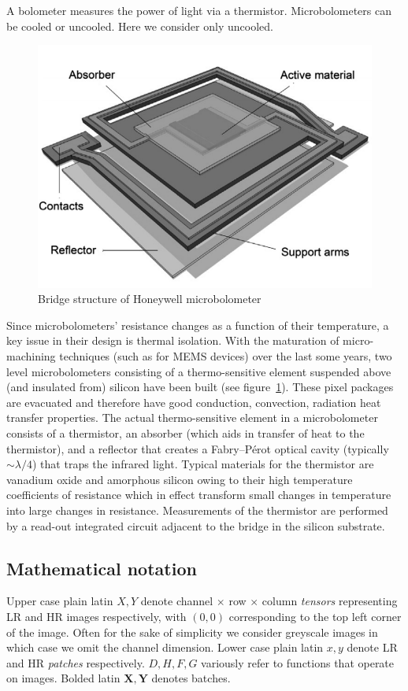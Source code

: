 A bolometer measures the power of light via a thermistor.
%
Microbolometers can be cooled or uncooled.
%
Here we consider only uncooled.
%
\begin{figure}
    \center
    \includegraphics[width=.7\linewidth,keepaspectratio]{figures/microbolometer2.png}
    \caption{Bridge structure of Honeywell microbolometer\cite{KESIM2014245}}
    \label{fig:microbolometer}
\end{figure}
%
Since microbolometers' resistance changes as a function of their temperature, a key issue in their design is thermal isolation.
%
With the maturation of micro-machining techniques (such as for MEMS devices) over the last some years, two level microbolometers consisting of a thermo-sensitive element suspended above (and insulated from) silicon have been built (see figure~\ref{fig:microbolometer}).
%
These pixel packages are evacuated and therefore have good conduction, convection, radiation heat transfer properties.
%
The actual thermo-sensitive element in a microbolometer consists of a thermistor, an absorber (which aids in transfer of heat to the thermistor), and a reflector that creates a Fabry–Pérot optical cavity (typically ${\sim}\lambda/4$\cite{bolometer}) that traps the infrared light.
%
Typical materials for the thermistor are vanadium oxide and amorphous silicon owing to their high temperature coefficients of resistance\cite{bolometer} which in effect transform small changes in temperature into large changes in resistance.
%
Measurements of the thermistor are performed by a read-out integrated circuit adjacent to the bridge in the silicon substrate.


\subsection{Mathematical notation}\label{subsec:notation}
Upper case plain latin $X, Y$ denote channel $\times$ row $\times$ column \textit{tensors} representing LR and HR images respectively, with $(0,0)$ corresponding to the top left corner of the image.
%
Often for the sake of simplicity we consider greyscale images in which case we omit the channel dimension.
%
Lower case plain latin $x, y$ denote LR and HR \textit{patches} respectively.
%
$D, H, F, G$ variously refer to functions that operate on images.
%
Bolded latin $\bm{X}, \bm{Y}$ denotes batches.

